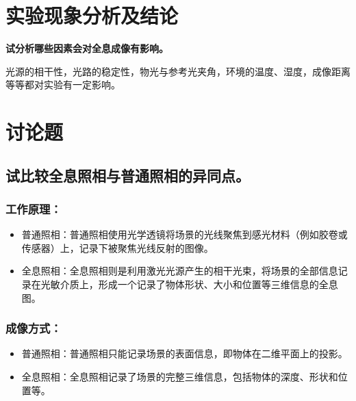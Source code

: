 \documentclass{ctexart}
\begin{document}
\newpage
\section{实验现象分析及结论}
\textbf{试分析哪些因素会对全息成像有影响。}

光源的相干性，光路的稳定性，物光与参考光夹角，环境的温度、湿度，成像距离等等都对实验有一定影响。

\section{讨论题}
\subsection{试比较全息照相与普通照相的异同点。}
\subsubsection{工作原理：}

\begin{itemize}
    

    \item 普通照相：普通照相使用光学透镜将场景的光线聚焦到感光材料（例如胶卷或传感器）上，记录下被聚焦光线反射的图像。
    \item 全息照相：全息照相则是利用激光光源产生的相干光束，将场景的全部信息记录在光敏介质上，形成一个记录了物体形状、大小和位置等三维信息的全息图。
\end{itemize}    

\subsubsection{成像方式：}
\begin{itemize}  
    \item 普通照相：普通照相只能记录场景的表面信息，即物体在二维平面上的投影。
    \item 全息照相：全息照相记录了场景的完整三维信息，包括物体的深度、形状和位置等。
\end{itemize}
\end{document}
